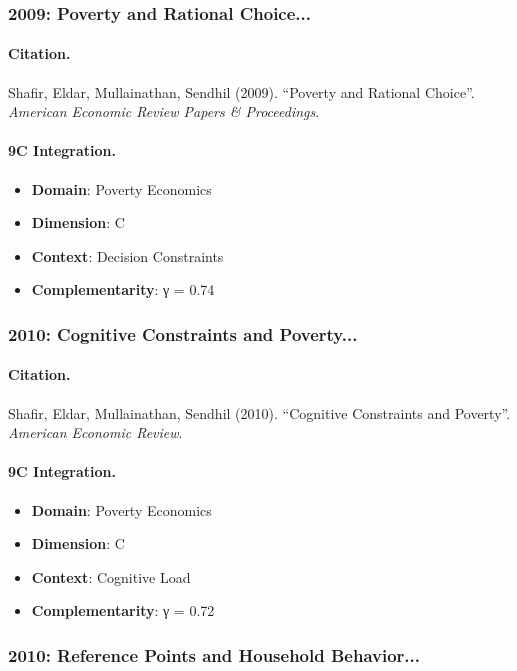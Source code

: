 \subsubsection{2009: Poverty and Rational Choice...}

\paragraph{Citation.}
Shafir, Eldar, Mullainathan, Sendhil (2009). ``Poverty and Rational Choice''. \textit{American Economic Review Papers & Proceedings}.

\paragraph{9C Integration.}
\begin{itemize}[nosep]
  \item \textbf{Domain}: Poverty Economics
  \item \textbf{Dimension}: C
  \item \textbf{Context}: Decision Constraints
  \item \textbf{Complementarity}: γ = 0.74
\end{itemize}


\subsubsection{2010: Cognitive Constraints and Poverty...}

\paragraph{Citation.}
Shafir, Eldar, Mullainathan, Sendhil (2010). ``Cognitive Constraints and Poverty''. \textit{American Economic Review}.

\paragraph{9C Integration.}
\begin{itemize}[nosep]
  \item \textbf{Domain}: Poverty Economics
  \item \textbf{Dimension}: C
  \item \textbf{Context}: Cognitive Load
  \item \textbf{Complementarity}: γ = 0.72
\end{itemize}


\subsubsection{2010: Reference Points and Household Behavior...}

